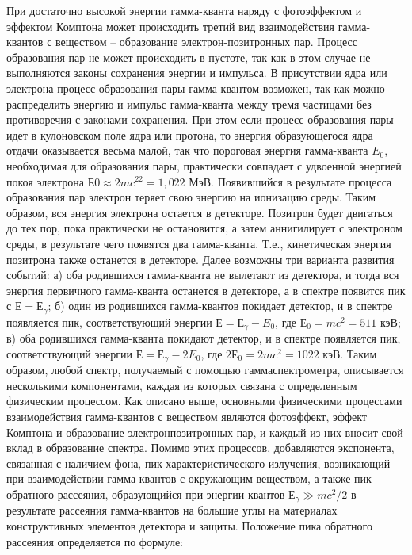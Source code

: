 При достаточно высокой энергии гамма-кванта наряду с фотоэффектом и эффектом
Комптона может происходить третий вид взаимодействия гамма-квантов с веществом –
образование электрон-позитронных пар. Процесс образования пар не может
происходить в пустоте, так как в этом случае не выполняются законы сохранения
энергии и импульса. В присутствии ядра или электрона процесс образования пары
гамма-квантом возможен, так как можно распределить энергию и импульс
гамма-кванта между тремя частицами без противоречия с законами сохранения. При
этом если процесс образования пары идет в кулоновском поле ядра или протона, то
энергия образующегося ядра отдачи оказывается весьма малой, так что пороговая
энергия гамма-кванта $E_0$, необходимая для образования пары, практически
совпадает с удвоенной энергией покоя электрона $Е0 \approx 2 m c^22 = 1,022$
МэВ. Появившийся в результате процесса образования пар электрон теряет свою
энергию на ионизацию среды. Таким образом, вся энергия электрона остается в
детекторе. Позитрон будет двигаться до тех пор, пока практически не остановится,
а затем аннигилирует с электроном среды, в результате чего появятся два
гамма-кванта. Т.е., кинетическая энергия позитрона также останется в детекторе.
Далее возможны три варианта развития событий: а) оба родившихся гамма-кванта не
вылетают из детектора, и тогда вся энергия первичного гамма-кванта останется в
детекторе, а в спектре появится пик с $Е = Е_{\gamma}$; б) один из родившихся
гамма-квантов покидает детектор, и в спектре появляется пик, соответствующий
энергии $Е = Е_{\gamma} - E_0$, где $Е_0= m c^2 = 511$ кэВ; в) оба родившихся
гамма-кванта покидают детектор, и в спектре появляется пик, соответствующий
энергии $Е = Е_{\gamma} - 2 E_0$, где $2 Е_0 = 2 m c^2 = 1022$ кэВ. Таким
образом, любой спектр, получаемый с помощью гаммаспектрометра, описывается
несколькими компонентами, каждая из которых связана с определенным физическим
процессом. Как описано выше, основными физическими процессами взаимодействия
гамма-квантов с веществом являются фотоэффект, эффект Комптона и образование
электронпозитронных пар, и каждый из них вносит свой вклад в образование
спектра. Помимо этих процессов, добавляются экспонента, связанная с наличием
фона, пик характеристического излучения, возникающий при взаимодействии
гамма-квантов с окружающим веществом, а также пик обратного рассеяния,
образующийся при энергии квантов $Е_{\gamma} \gg m c^2 / 2$ в результате
рассеяния гамма-квантов на большие углы на материалах конструктивных элементов
детектора и защиты. Положение пика обратного рассеяния определяется по формуле:

